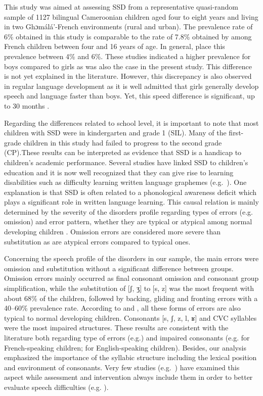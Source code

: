 \documentclass[output=paper,newtxmath,modfonts,nonflat,draftmode]{langsci/langscibook}
\begin{document}
This study was aimed at assessing SSD from a representative quasi-random sample of 1127 bilingual Cameroonian children aged four to eight years and living in two Ghɔmálá’-French environments (rural and urban). The prevalence rate of 6\% obtained in this study is comparable to the rate of 7.8\% obtained by \citet{Fombonne1997} among French children between four and 16 years of age. In general, \citet{Kirkpatrick1984} place this prevalence between 4\% and 6\%. These studies indicated a higher prevalence for boys compared to girls as was also the case in the present study. This difference is not yet explained in the literature. However, this discrepancy is also observed in regular language development as it is well admitted that girls generally develop speech and language faster than boys. Yet, this speed difference is significant, up to 30 months \citep{Eriksson2012}. 

Regarding the differences related to school level, it is important to note that most children with SSD were in kindergarten and grade 1 (SIL). Many of the first-grade children in this study had failed to progress to the second grade (CP).These results can be interpreted as evidence that SSD is a handicap to children's academic performance. Several studies have linked SSD to children's education and it is now well recognized that they can give rise to learning disabilities such as difficulty learning written language graphemes (e.g.~\citealt{Rvachew2007}). One explanation is that SSD is often related to a phonological awareness deficit which plays a significant role in written language learning. This causal relation is mainly determined by the severity of the disorders profile regarding types of errors (e.g. omission) and error pattern, whether they are typical or atypical among normal developing children \cite{RvachewChiangEvans2007}. Omission errors are considered more severe than substitution as are atypical errors compared to typical ones.

Concerning the speech profile of the disorders in our sample, the main errors were omission and substitution without a significant difference between groups. Omission errors mainly occurred as final consonant omission and consonant group simplification, while the substitution of [ʃ, ʒ] to [s, z] was the most frequent with about 68\% of the children, followed by backing, gliding and fronting errors with a 40--60\% prevalence rate. According to \citet{RvachewChiangEvans2007} and \citet{Fox2001}, all these forms of errors are also typical to normal developing children. Consonants [s, ʃ, z, l, ʁ] and CVC syllables were the most impaired structures. These results are consistent with the literature both regarding type of errors (e.g.\citealt{Austin1997,Ruscello1991}) and impaired consonants (e.g. \citet{Maurin-Cherou1993} for French-speaking children; \citet{Shriberg1994} for English-speaking children). Besides, our analysis emphasized the importance of the syllabic structure including the lexical position and environment of consonants. Very few studies (e.g.~\citealt{RvachewChiangEvans2007}) have examined this aspect while assessment and intervention always include them in order to better evaluate speech difficulties (e.g. \citealt{Maurin-Cherou1993}). 
\end{document}
